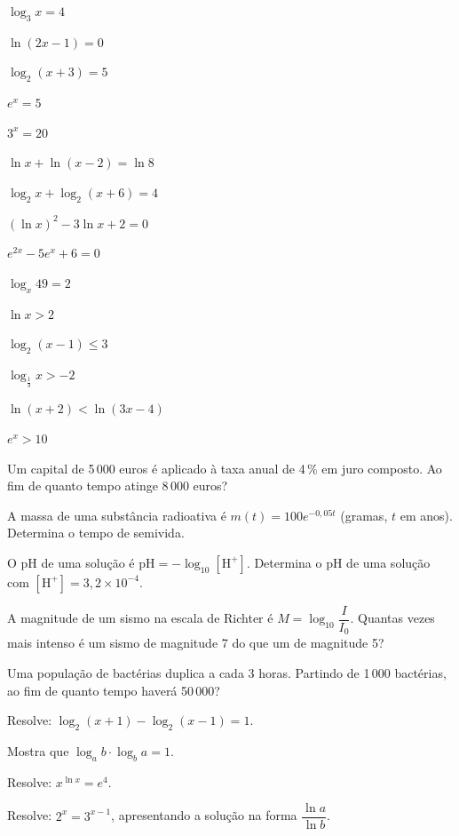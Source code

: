 \documentclass[12pt]{article}
\begin{document}
\begin{exercicios}
  \item $\log_3 x = 4$
  \item $\ln(2x - 1) = 0$
  \item $\log_2(x + 3) = 5$
  \item $e^x = 5$
  \item $3^{x} = 20$
  \item $\ln x + \ln(x - 2) = \ln 8$
  \item $\log_2 x + \log_2(x + 6) = 4$
  \item $(\ln x)^2 - 3\ln x + 2 = 0$
  \item $e^{2x} - 5e^x + 6 = 0$
  \item $\log_x 49 = 2$
\end{exercicios}

\begin{exercicios}
  \item $\ln x > 2$
  \item $\log_2(x - 1) \le 3$
  \item $\log_{\frac{1}{3}} x > -2$
  \item $\ln(x + 2) < \ln(3x - 4)$
  \item $e^{x} > 10$
\end{exercicios}

\begin{exercicios}
  \item Um capital de 5\,000 euros é aplicado à taxa anual de 4\,\% em juro composto. Ao fim de quanto tempo atinge 8\,000 euros?
  \item A massa de uma substância radioativa é $m(t) = 100e^{-0{,}05t}$ (gramas, $t$ em anos). Determina o tempo de semivida.
  \item O pH de uma solução é $\text{pH} = -\log_{10}[\text{H}^+]$. Determina o pH de uma solução com $[\text{H}^+] = 3{,}2 \times 10^{-4}$.
  \item A magnitude de um sismo na escala de Richter é $M = \log_{10}\dfrac{I}{I_0}$. Quantas vezes mais intenso é um sismo de magnitude 7 do que um de magnitude 5?
  \item Uma população de bactérias duplica a cada 3 horas. Partindo de 1\,000 bactérias, ao fim de quanto tempo haverá 50\,000?
\end{exercicios}

\begin{exercicios}
  \item Resolve: $\log_2(x + 1) - \log_2(x - 1) = 1$.
  \item Mostra que $\log_a b \cdot \log_b a = 1$.
  \item Resolve: $x^{\ln x} = e^4$.
  \item Resolve: $2^{x} = 3^{x - 1}$, apresentando a solução na forma $\dfrac{\ln a}{\ln b}$.
\end{exercicios}
\end{document}
